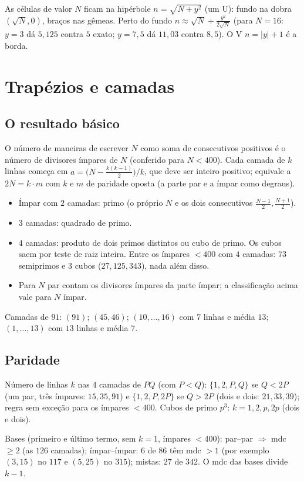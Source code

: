 \documentclass[11pt,a4paper]{article}
\begin{document}
As células de valor $N$ ficam na hipérbole $n=\sqrt{N+y^2}$ (um U): fundo na dobra $(\sqrt N,0)$, braços nas gêmeas. Perto do fundo $n\approx\sqrt N+\tfrac{y^2}{2\sqrt N}$ (para $N=16$: $y=3$ dá $5{,}125$ contra $5$ exato; $y=7{,}5$ dá $11{,}03$ contra $8{,}5$). O V $n=|y|+1$ é a borda.

\section{Trapézios e camadas}

\subsection{O resultado básico}
O número de maneiras de escrever $N$ como soma de consecutivos positivos é o número de divisores ímpares de $N$ (conferido para $N<400$). Cada camada de $k$ linhas começa em $a=\bigl(N-\tfrac{k(k-1)}{2}\bigr)/k$, que deve ser inteiro positivo; equivale a $2N=k\cdot m$ com $k$ e $m$ de paridade oposta (a parte par e a ímpar como degraus).
\begin{itemize}[leftmargin=1.4em]
  \item Ímpar com $2$ camadas: primo (o próprio $N$ e os dois consecutivos $\tfrac{N-1}{2},\tfrac{N+1}{2}$).
  \item $3$ camadas: quadrado de primo.
  \item $4$ camadas: produto de dois primos distintos ou cubo de primo. Os cubos saem por teste de raiz inteira. Entre os ímpares $<400$ com $4$ camadas: $73$ semiprimos e $3$ cubos ($27,125,343$), nada além disso.
  \item Para $N$ par contam os divisores ímpares da parte ímpar; a classificação acima vale para $N$ ímpar.
\end{itemize}
Camadas de $91$: $(91)$; $(45,46)$; $(10,\dots,16)$ com $7$ linhas e média $13$; $(1,\dots,13)$ com $13$ linhas e média $7$.

\subsection{Paridade}
Número de linhas $k$ nas $4$ camadas de $PQ$ (com $P<Q$): $\{1,2,P,Q\}$ se $Q<2P$ (um par, três ímpares: $15,35,91$) e $\{1,2,P,2P\}$ se $Q>2P$ (dois e dois: $21,33,39$); regra sem exceção para os ímpares $<400$. Cubos de primo $p^3$: $k=1,2,p,2p$ (dois e dois).

Bases (primeiro e último termo, sem $k=1$, ímpares $<400$): par--par $\Rightarrow$ mdc $\ge2$ (as $126$ camadas); ímpar--ímpar: $6$ de $86$ têm mdc $>1$ (por exemplo $(3,15)$ no $117$ e $(5,25)$ no $315$); mistas: $27$ de $342$. O mdc das bases divide $k-1$.
\end{document}
